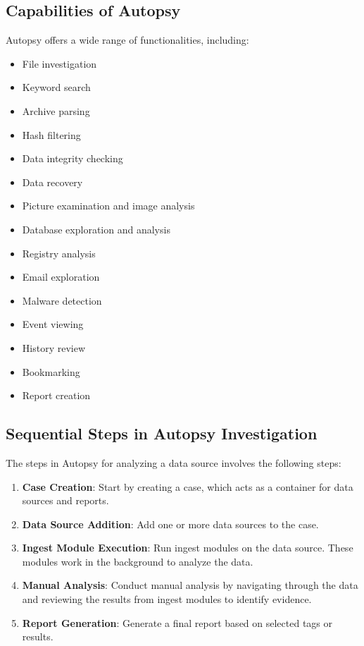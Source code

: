 \documentclass{article}
\begin{document}
\subsection{Capabilities of Autopsy}
Autopsy offers a wide range of functionalities, including:
\begin{itemize}
    \item File investigation
    \item Keyword search
    \item Archive parsing
    \item Hash filtering
    \item Data integrity checking
    \item Data recovery
    \item Picture examination and image analysis
    \item Database exploration and analysis
    \item Registry analysis
    \item Email exploration
    \item Malware detection
    \item Event viewing
    \item History review
    \item Bookmarking
    \item Report creation
\end{itemize}

\subsection{Sequential Steps in Autopsy Investigation}
The steps in Autopsy for analyzing a data source involves the following steps:
\begin{enumerate}
    \item \textbf{Case Creation}: Start by creating a case, which acts as a container for data sources and reports.
    \item \textbf{Data Source Addition}: Add one or more data sources to the case.
    \item \textbf{Ingest Module Execution}: Run ingest modules on the data source. These modules work in the background to analyze the data.
    \item \textbf{Manual Analysis}: Conduct manual analysis by navigating through the data and reviewing the results from ingest modules to identify evidence.
    \item \textbf{Report Generation}: Generate a final report based on selected tags or results.
\end{enumerate}
\end{document}
